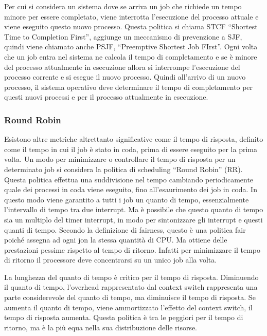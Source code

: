 \documentclass{article}
\numberwithin{equation}{subsection}
\begin{document}
Per cui si considera un sistema dove se arriva un job che richiede un tempo minore per essere completato, viene interrotta l'esecuzione del processo attuale e viene 
eseguito questo nuovo processo. Questa politica si chiama STCF ``Shortest Time to Completion First'', aggiunge un meccanismo di prevenzione a SJF, quindi viene chiamato 
anche PSJF, ``Preemptive Shortest Job FIrst''. Ogni volta che un job entra nel sistema ne calcola il tempo di completamento e se è minore del processo attualmente in 
esecuzione allora si interrompe l'esecuzione del processo corrente e si esegue il nuovo processo. Quindi all'arrivo di un nuovo processo, il sistema operativo deve 
determinare il tempo di completamento per questi nuovi processi e per il processo attualmente in esecuzione. 

\subsubsection{Round Robin}

Esistono altre metriche altrettanto significative come il tempo di risposta, definito come il tempo in cui il job è stato in coda, prima di essere eseguito per la prima 
volta. Un modo per minimizzare o controllare il tempo di risposta per un determinato job si considera la politica di scheduling ``Round Robin'' (RR). Questa politica effettua 
una suddivisione nel tempo cambiando periodicamente quale dei processi in coda viene eseguito, fino all'esaurimento dei job in coda. In questo modo viene garantito a 
tutti i job un quanto di tempo, essenzialmente l'intervallo di tempo tra due interrupt. Ma è possibile che questo quanto di tempo sia un multiplo del timer interrupt, in 
modo per sintonizzare gli interrupt e questi quanti di tempo. Secondo la definizione di fairness, questo è una politica fair poiché assegna ad ogni jon la stessa quantità 
di CPU. Ma ottiene delle prestazioni pessime rispetto al tempo di ritorno. 
Infatti per minimizzare il tempo di ritorno il processore deve concentrarsi su un unico job alla volta. 


La lunghezza del quanto di tempo è critico per il tempo di risposta. Diminuendo il quanto di tempo, l'overhead rappresentato dal context switch rappresenta una parte 
considerevole del quanto di tempo, ma diminuisce il tempo di risposta. Se aumenta il quanto di tempo, viene ammortizzato l'effetto del context switch, il tempo di 
risposta aumenta. 
Questa politica è tra le peggiori per il tempo di ritorno, ma è la più equa nella sua distribuzione delle risorse. 
\end{document}
